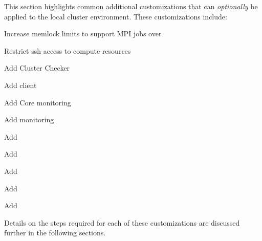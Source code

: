 This section highlights common additional customizations that can {\em
optionally} be applied to the local cluster environment. These customizations
include:

\begin{itemize*}
\item Increase memlock limits to support MPI jobs over \InfiniBand{}
\item Restrict ssh access to compute resources
\item Add Cluster Checker
\item Add \Lustre{} client
\item Add \Nagios{} Core monitoring
\item Add \Ganglia{} monitoring
\item Add \clustershell{}
\item Add \mrsh{}
\item Add \genders{}
\item Add \powerman{}
\item Add \conman{}  
\end{itemize*}

\noindent Details on the steps required for each of these customizations are
discussed further in the following sections.
